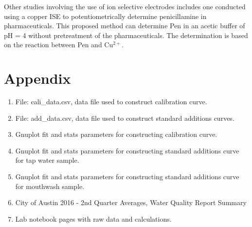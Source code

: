 \documentclass{article}
\begin{document}
Other studies involving the use of ion selective electrodes includes one
conducted using a copper ISE to potentiometrically determine penicillamine in
pharmaceuticals. \cite{pen} This proposed method can determine Pen in an acetic
buffer of pH = 4 without pretreatment of the pharmaceuticals.  The determination
is based on the reaction between Pen and Cu$^{2+}$.


\newpage



\newpage

\section*{Appendix}

\begin{enumerate}
    \item File: cali\_data.csv, data file used to construct calibration curve.
    \item File: add\_data.csv, data file used to construct standard additions curves.
    \item Gnuplot fit and stats parameters for constructing calibration curve.
    \item Gnuplot fit and stats parameters for constructing standard additions
        curve for tap water sample.
    \item Gnuplot fit and stats parameters for constructing standard additions
        curve for mouthwash sample.
    \item City of Austin 2016 - 2nd Quarter Averages, Water Quality Report
        Summary
    \item Lab notebook pages with raw data and calculations.
\end{enumerate}

\newpage
{}
\vspace{8cm}
\newpage
{}
\newpage
{}
\newpage
{}
\newpage
{}
\newpage
{}
\newpage
{}
\newpage

\end{document}
